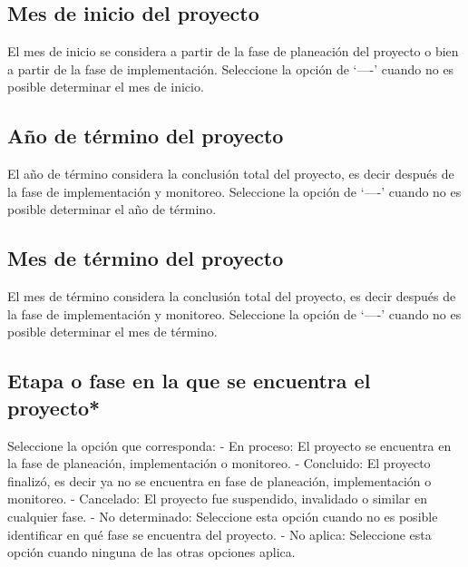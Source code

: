 \documentclass[
]{book}
\begin{document}
\hypertarget{mes-de-inicio-del-proyecto}{%
\subsection{Mes de inicio del proyecto}\label{mes-de-inicio-del-proyecto}}

El mes de inicio se considera a partir de la fase de planeación del proyecto o bien a partir de la fase de implementación.
Seleccione la opción de `----' cuando no es posible determinar el mes de inicio.

\hypertarget{auxf1o-de-tuxe9rmino-del-proyecto}{%
\subsection{Año de término del proyecto}\label{auxf1o-de-tuxe9rmino-del-proyecto}}

El año de término considera la conclusión total del proyecto, es decir después de la fase de implementación y monitoreo.
Seleccione la opción de `----' cuando no es posible determinar el año de término.

\hypertarget{mes-de-tuxe9rmino-del-proyecto}{%
\subsection{Mes de término del proyecto}\label{mes-de-tuxe9rmino-del-proyecto}}

El mes de término considera la conclusión total del proyecto, es decir después de la fase de implementación y monitoreo.
Seleccione la opción de `----' cuando no es posible determinar el mes de término.

\hypertarget{etapa-o-fase-en-la-que-se-encuentra-el-proyecto}{%
\subsection{Etapa o fase en la que se encuentra el proyecto*}\label{etapa-o-fase-en-la-que-se-encuentra-el-proyecto}}

Seleccione la opción que corresponda: - En proceso: El proyecto se encuentra en la fase de planeación, implementación o monitoreo.
- Concluido: El proyecto finalizó, es decir ya no se encuentra en fase de planeación, implementación o monitoreo.
- Cancelado: El proyecto fue suspendido, invalidado o similar en cualquier fase.
- No determinado: Seleccione esta opción cuando no es posible identificar en qué fase se encuentra del proyecto.
- No aplica: Seleccione esta opción cuando ninguna de las otras opciones aplica.
\end{document}
